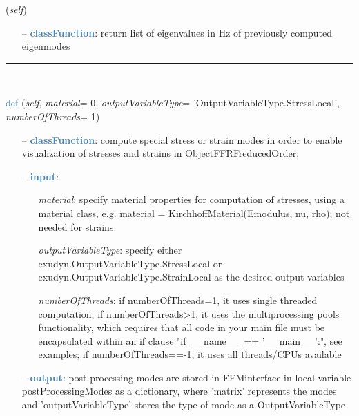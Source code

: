 \begin{itemize}[leftmargin=1.4cm]
\begin{itemize}[leftmargin=1.4cm]
\begin{itemize}[leftmargin=0.5cm]
\begin{itemize}[leftmargin=1.4cm]
\begin{itemize}[leftmargin=1.4cm]
\begin{itemize}[leftmargin=0.5cm]
\begin{flushleft}
({\it self})
\end{flushleft}
\setlength{\itemindent}{0.7cm}
\begin{itemize}[leftmargin=0.7cm]
\item[--]\textcolor{steelblue}{\bf classFunction}: return list of eigenvalues in Hz of previously computed eigenmodes
\vspace{12pt}\end{itemize}
%
\noindent\rule{8cm}{0.75pt}\vspace{1pt} \\ 
\begin{flushleft}
\noindent \textcolor{steelblue}{def {\bf {}}}\label{sec:FEM:FEMinterface:ComputePostProcessingModes}
({\it self}, {\it material}= 0, {\it outputVariableType}= 'OutputVariableType.StressLocal', {\it numberOfThreads}= 1)
\end{flushleft}
\setlength{\itemindent}{0.7cm}
\begin{itemize}[leftmargin=0.7cm]
\item[--]\textcolor{steelblue}{\bf classFunction}: compute special stress or strain modes in order to enable visualization of stresses and strains in ObjectFFRFreducedOrder;
\item[--]\textcolor{steelblue}{\bf input}: \vspace{-6pt}
\begin{itemize}[leftmargin=1.2cm]
\setlength{\itemindent}{-0.7cm}
\item[]{\it material}: specify material properties for computation of stresses, using a material class, e.g. material = KirchhoffMaterial(Emodulus, nu, rho); not needed for strains
\item[]{\it outputVariableType}: specify either exudyn.OutputVariableType.StressLocal or exudyn.OutputVariableType.StrainLocal as the desired output variables
\item[]{\it numberOfThreads}: if numberOfThreads=1, it uses single threaded computation; if numberOfThreads>1, it uses the multiprocessing pools functionality, which requires that all code in your main file must be encapsulated within an if clause "if \_\_name\_\_ == '\_\_main\_\_':", see examples; if numberOfThreads==-1, it uses all threads/CPUs available
\end{itemize}
\item[--]\textcolor{steelblue}{\bf output}: post processing modes are stored in FEMinterface in local variable postProcessingModes as a dictionary, where 'matrix' represents the modes and 'outputVariableType' stores the type of mode as a OutputVariableType

\end{itemize}
\end{itemize}
\end{itemize}
\end{itemize}
\end{itemize}
\end{itemize}
\end{itemize}

